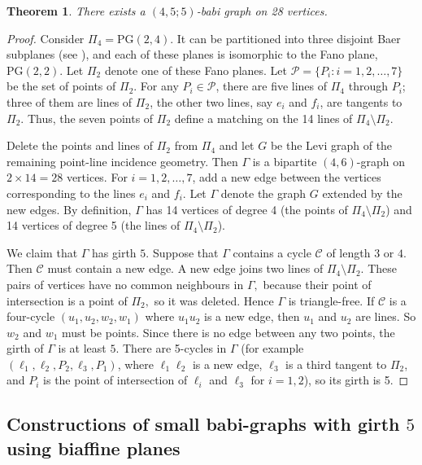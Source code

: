 \documentclass[a4paper,11pt]{article}
\newtheorem{theorem}{Theorem}[section]
\begin{document}
\begin{theorem}
There exists a $(4,5;5)$-babi graph on 28 vertices.
\end{theorem}

\begin{proof}
Consider $\Pi _4=\mathrm{PG}(2,4)$. It can be partitioned into three disjoint Baer
subplanes (see \cite{bruck}), and each of these planes is isomorphic to the Fano plane,
$\mathrm{PG}(2,2)$. Let $\Pi_2$ denote one of these Fano planes. Let 
$\mathcal{P}=\{ P_i \colon i=1,2,\dots ,7\}$ be the set of points of $\Pi_2$. 
For any $P_i\in \mathcal{P}$, there are five lines of $\Pi_4$ through $P_i$; three
of them are lines of $\Pi_2$, the other two lines, say $e_i$ and $f_i$, are
tangents to $\Pi_2$. Thus, the seven points of $\Pi_2$ define a matching on the 14 
lines of $\Pi_4\setminus \Pi_2$.

Delete the points and lines of $\Pi_2$ from $\Pi_4$ and let $G$ be the Levi graph of the remaining point-line incidence geometry. Then $\Gamma $ is a bipartite $(4,6)$-graph on $2\times 14=28$ vertices. For $i=1,2,\dots,7$, add a new edge between the
vertices corresponding to the lines $e_i$ and $f_i$. Let $\Gamma $ denote the graph $G$
extended by the new edges. By definition, $\Gamma $ has 14 vertices of degree 4
(the points of $\Pi_4\setminus \Pi_2$) and 14 vertices of degree 5 (the lines of $\Pi_4\setminus \Pi_2$).

We claim that $\Gamma $ has girth $5.$ 
Suppose that $\Gamma $ contains a cycle $\mathcal{C}$ of length $3$ or $4$. Then 
$\mathcal{C}$ must contain a new edge. A new edge joins two lines of 
$\Pi_4\setminus \Pi_2$. These pairs of vertices have no common neighbours in 
$\Gamma,$ because their point of intersection is a point of $\Pi_2,$ so it was
deleted. Hence $\Gamma $ is triangle-free. If 
$\mathcal{C}$ is a four-cycle $(u_1,u_2,w_2,w_1)$ where $u_1u_2$ is a new edge, 
then $u_1$ and $u_2$ are lines. So $w_2$ and $w_1$ must be points. Since there is no edge between any two points, the girth of $\Gamma $ is at least $5.$ 
There are 5-cycles in $\Gamma $
(for example $(\ell_1,\ell_2,P_2,\ell _3,P_1)$, where $\ell _1\ell_2$ is a new 
edge, $\ell _3$ is a third tangent to $\Pi_2$, and $P_i$ is the point of intersection of $\ell_i$ and $\ell_3$
for $i=1,2$), so its girth is 5.
\end{proof}


\subsection{Constructions of small babi-graphs with girth $5$ using biaffine planes}
\end{document}
